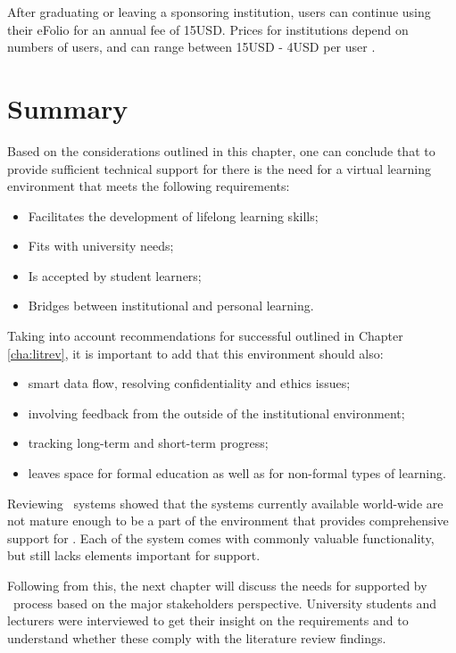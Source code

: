 After graduating or leaving a sponsoring institution, users can continue
using their eFolio for an annual fee of 15USD. Prices for institutions depend
on numbers of users, and can range between 15USD - 4USD per user
\citep{AAEEBL2011}.

\section{Summary}

Based on the considerations outlined in this chapter, one can conclude that to
provide sufficient technical support for \LLLs there is the need for a virtual
learning environment that meets the following requirements:

\begin{itemize}
	\item Facilitates the development of lifelong learning skills;
	\item Fits with university needs;
	\item Is accepted by student learners;
	\item Bridges between institutional and personal learning.
\end{itemize}

Taking into account recommendations for successful \LLLs outlined in Chapter
\ref{cha:litrev}, it is important to add that this environment should also:

\begin{itemize}
	\item smart data flow, resolving confidentiality and ethics issues;
	\item involving feedback from the outside of the institutional environment;
	\item tracking long-term and short-term progress;
	\item leaves space for formal education as well as for non-formal types of
	learning.
\end{itemize}

Reviewing \ep~systems showed that the systems currently available world-wide are
not mature enough to be a part of the environment that provides comprehensive
support for \LLLsn. Each of the system comes with commonly valuable
functionality, but still lacks elements important for \LLLs support.

Following from this, the next chapter will discuss the needs for \LLLs supported
by \ep~process based on the major stakeholders perspective. University students
and lecturers were interviewed to get their insight on the requirements and to
understand whether these comply with the literature review findings.

